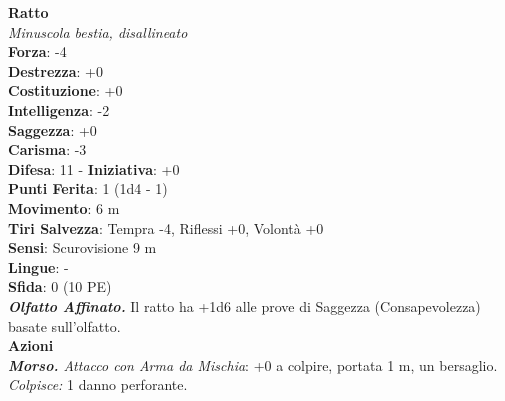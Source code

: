 \begin{multicols}{2}
\medskip\textbf{Ratto}\\
\emph{Minuscola bestia, disallineato}\\
\textbf{Forza}: -4\\
\textbf{Destrezza}: +0\\
\textbf{Costituzione}: +0\\
\textbf{Intelligenza}: -2\\
\textbf{Saggezza}: +0\\
\textbf{Carisma}: -3\\
\textbf{Difesa}: 11 - \textbf{Iniziativa}: +0\\
\textbf{Punti Ferita}: 1 (1d4 - 1)\\
\textbf{Movimento}: 6 m\\
\textbf{Tiri Salvezza}: Tempra -4, Riflessi +0, Volontà +0 \\
\textbf{Sensi}: Scurovisione 9 m\\
\textbf{Lingue}: -\\
\textbf{Sfida}: 0 (10 PE)\smallskip\\
\emph{\textbf{Olfatto Affinato.}} Il ratto ha +1d6 alle prove di Saggezza (Consapevolezza) basate sull'olfatto.\\
\smallskip\textbf{Azioni}\\
\emph{\textbf{Morso.} Attacco con Arma da Mischia}: +0 a colpire, portata 1 m, un bersaglio.\\
\emph{Colpisce:} 1 danno perforante.\\


\end{multicols}
